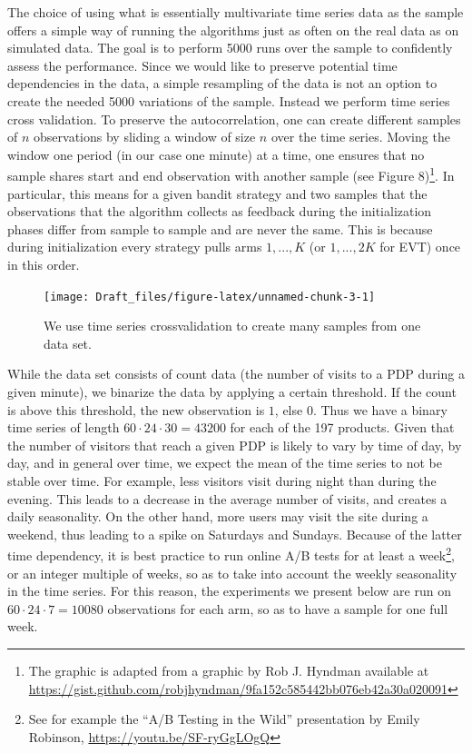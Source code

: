 \documentclass[11pt,]{article}
\let\rmarkdownfootnote\footnote%
\def\footnote{\protect\rmarkdownfootnote}
\begin{document}
The choice of using what is essentially multivariate time series data as
the sample offers a simple way of running the algorithms just as often
on the real data as on simulated data. The goal is to perform 5000 runs
over the sample to confidently assess the performance. Since we would
like to preserve potential time dependencies in the data, a simple
resampling of the data is not an option to create the needed 5000
variations of the sample. Instead we perform time series cross
validation. To preserve the autocorrelation, one can create different
samples of \(n\) observations by sliding a window of size \(n\) over the
time series. Moving the window one period (in our case one minute) at a
time, one ensures that no sample shares start and end observation with
another sample (see Figure 8)\footnote{The graphic is adapted from a
  graphic by Rob J. Hyndman available at
  \url{https://gist.github.com/robjhyndman/9fa152c585442bb076eb42a30a020091}}.
In particular, this means for a given bandit strategy and two samples
that the observations that the algorithm collects as feedback during the
initialization phases differ from sample to sample and are never the
same. This is because during initialization every strategy pulls arms
\(1, ..., K\) (or \(1,...,2K\) for EVT) once in this order.

\begin{figure}

{\centering \texttt{[image: Draft\_files/figure-latex/unnamed-chunk-3-1]} 

}

\caption{We use time series crossvalidation to create many samples from one data set.}\label{fig:unnamed-chunk-3}
\end{figure}

While the data set consists of count data (the number of visits to a PDP
during a given minute), we binarize the data by applying a certain
threshold. If the count is above this threshold, the new observation is
\(1\), else \(0\). Thus we have a binary time series of length
\(60\cdot 24 \cdot 30 = 43200\) for each of the 197 products. Given that
the number of visitors that reach a given PDP is likely to vary by time
of day, by day, and in general over time, we expect the mean of the time
series to not be stable over time. For example, less visitors visit
during night than during the evening. This leads to a decrease in the
average number of visits, and creates a daily seasonality. On the other
hand, more users may visit the site during a weekend, thus leading to a
spike on Saturdays and Sundays. Because of the latter time dependency,
it is best practice to run online A/B tests for at least a
week\footnote{See for example the ``A/B Testing in the Wild''
  presentation by Emily Robinson, \url{https://youtu.be/SF-ryGgLOgQ}},
or an integer multiple of weeks, so as to take into account the weekly
seasonality in the time series. For this reason, the experiments we
present below are run on \(60 \cdot 24 \cdot 7 = 10080\) observations
for each arm, so as to have a sample for one full week.
\end{document}
